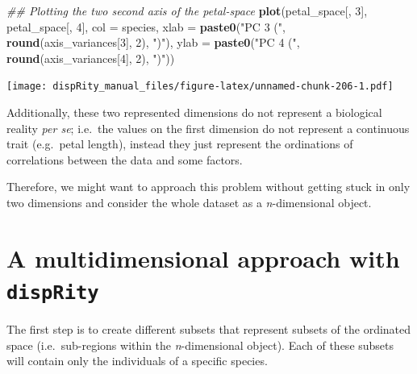 \documentclass[
]{book}
\newenvironment{Shaded}{\begin{snugshade}}{\end{snugshade}}
\newcommand{\CommentTok}[1]{\textcolor[rgb]{0.56,0.35,0.01}{\textit{#1}}}
\newcommand{\DataTypeTok}[1]{\textcolor[rgb]{0.13,0.29,0.53}{#1}}
\newcommand{\DecValTok}[1]{\textcolor[rgb]{0.00,0.00,0.81}{#1}}
\newcommand{\KeywordTok}[1]{\textcolor[rgb]{0.13,0.29,0.53}{\textbf{#1}}}
\newcommand{\NormalTok}[1]{#1}
\newcommand{\StringTok}[1]{\textcolor[rgb]{0.31,0.60,0.02}{#1}}
\begin{document}
\begin{Shaded}
\begin{Highlighting}[]
\CommentTok{\#\# Plotting the two second axis of the petal{-}space}
\KeywordTok{plot}\NormalTok{(petal\_space[, }\DecValTok{3}\NormalTok{], petal\_space[, }\DecValTok{4}\NormalTok{], }\DataTypeTok{col =}\NormalTok{ species,}
    \DataTypeTok{xlab =} \KeywordTok{paste0}\NormalTok{(}\StringTok{"PC 3 ("}\NormalTok{, }\KeywordTok{round}\NormalTok{(axis\_variances[}\DecValTok{3}\NormalTok{], }\DecValTok{2}\NormalTok{), }\StringTok{")"}\NormalTok{),}
    \DataTypeTok{ylab =} \KeywordTok{paste0}\NormalTok{(}\StringTok{"PC 4 ("}\NormalTok{, }\KeywordTok{round}\NormalTok{(axis\_variances[}\DecValTok{4}\NormalTok{], }\DecValTok{2}\NormalTok{), }\StringTok{")"}\NormalTok{))}
\end{Highlighting}
\end{Shaded}

\texttt{[image: dispRity\_manual\_files/figure-latex/unnamed-chunk-206-1.pdf]}

Additionally, these two represented dimensions do not represent a biological reality \emph{per se}; i.e.~the values on the first dimension do not represent a continuous trait (e.g.~petal length), instead they just represent the ordinations of correlations between the data and some factors.

Therefore, we might want to approach this problem without getting stuck in only two dimensions and consider the whole dataset as a \emph{n}-dimensional object.

\hypertarget{a-multidimensional-approach-with-disprity}{%
\section{\texorpdfstring{A multidimensional approach with \texttt{dispRity}}{A multidimensional approach with dispRity}}\label{a-multidimensional-approach-with-disprity}}

The first step is to create different subsets that represent subsets of the ordinated space (i.e.~sub-regions within the \emph{n}-dimensional object).
Each of these subsets will contain only the individuals of a specific species.
\end{document}

